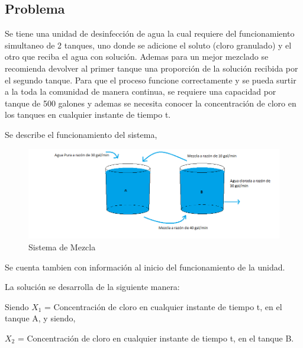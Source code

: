 \documentclass[titlepage]{article}
\begin{document}
    
        \subsection{Problema}
        
            Se tiene una unidad de desinfección de agua la cual requiere del funcionamiento simultaneo de 2 tanques, uno donde se adicione el soluto (cloro granulado) y el otro que reciba el agua con solución. Ademas para un mejor mezclado se recomienda devolver al primer tanque una proporción de la solución recibida por el segundo tanque. Para que el proceso funcione correctamente y se pueda surtir a la toda la comunidad de manera continua, se requiere una capacidad por tanque de 500 galones y ademas se necesita conocer la concentración de cloro en los tanques en cualquier instante de tiempo t. \par
            Se describe el funcionamiento del sistema,
            
            \begin{figure}[ht]
                    \begin{center}
                    \includegraphics[scale=0.4]{SistemadeMezcla}  
                \caption{Sistema de Mezcla}
                \end{center}
            \end{figure}
            
            
            Se cuenta tambien con información al inicio del funcionamiento de la unidad.\vspace{0.1cm}
                
            La solución se desarrolla de la siguiente manera:\par\vspace{0.1cm}
            
            Siendo $X_1$ = Concentración de cloro en cualquier instante de tiempo t, en el tanque A, y siendo,\par\vspace{0.1cm}
            $X_2$ = Concentración de cloro en cualquier instante de tiempo t, en el tanque B.\vspace{0.1cm}
            
\end{document}

